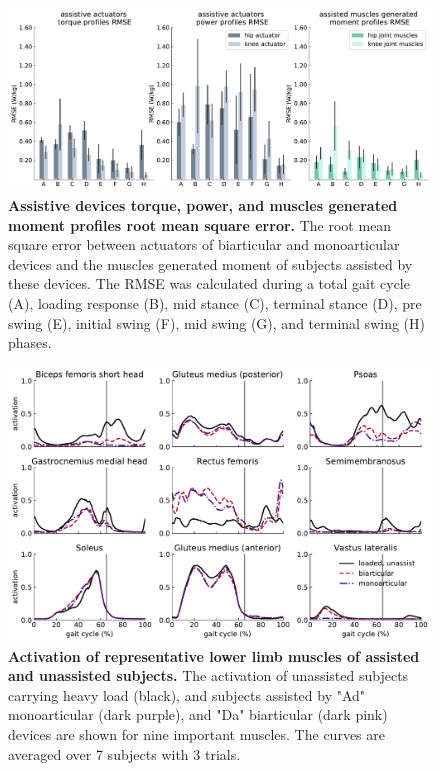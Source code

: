 \documentclass[10pt,letterpaper]{article}
\begin{document}
\begin{figure}[ht]   
	\centering
	\includegraphics[width=\linewidth]{Case_Studies/LoadedMono04_LoadedBi16/RMSE.pdf}
	\vspace{1mm}
	\caption{\small{\textbf{Assistive devices torque, power, and muscles generated moment profiles root mean square error. } The root mean square error between actuators of biarticular and monoarticular devices and the muscles generated moment of subjects assisted by these devices. The RMSE was calculated during a total gait cycle (A), loading response (B), mid stance (C), terminal stance (D), pre swing (E), initial swing (F), mid swing (G), and terminal swing (H) phases. }}
	\label{Fig_Case01_RMSE}
\end{figure}
\begin{figure}[ht]   
	\centering
	\includegraphics[width=\linewidth]{Case_Studies/LoadedMono04_LoadedBi16/MonoarticularVSBiarticular_Loaded_MusclesActivation.pdf}
	\vspace{1mm}
	\caption{\small{\textbf{Activation of representative lower limb muscles of assisted and unassisted subjects.} The activation of unassisted subjects carrying heavy load (black), and subjects assisted by "Ad" monoarticular (dark purple), and "Da" biarticular (dark pink) devices are shown for nine important muscles. The curves are averaged over 7 subjects with 3 trials.}}
	\label{Fig_Case01_MusclesActivity}
\end{figure}
\end{document}

